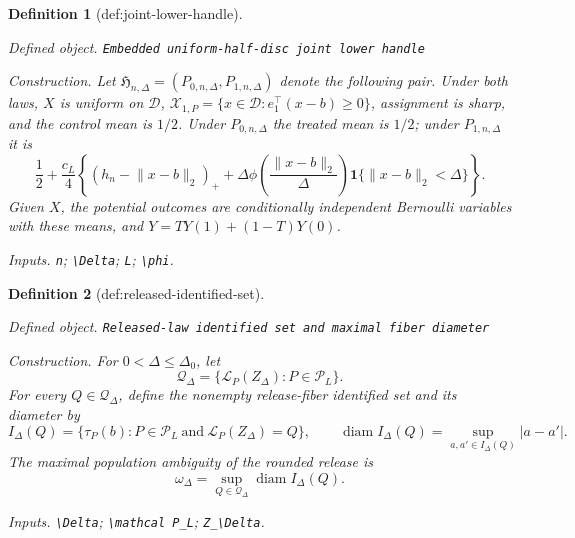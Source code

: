 \documentclass{article}
\newtheorem{definition}{Definition}
\begin{document}
\begin{definition}[def:joint-lower-handle]\label{def:joint-lower-handle}
\par\smallskip\noindent\emph{Defined object.} \texttt{Embedded uniform-\allowbreak{}half-\allowbreak{}disc joint lower handle}
\par\smallskip\noindent\emph{Construction.} Let \(\mathfrak H_{n,\Delta}=(P_{0,n,\Delta},P_{1,n,\Delta})\) denote the following pair.  Under both laws, \(X\) is uniform on \(\mathcal D\), \(\mathcal X_{1,P}=\{x\in\mathcal D:e_1^{\top}(x-b)\geq0\}\), assignment is sharp, and the control mean is \(1/2\).  Under \(P_{0,n,\Delta}\) the treated mean is \(1/2\); under \(P_{1,n,\Delta}\) it is
\[
 \frac12+\frac{c_L}{4}\left\{(h_n-\lVert x-b\rVert_2)_+
 +\Delta\phi\!\left(\frac{\lVert x-b\rVert_2}{\Delta}\right)
 \mathbf1\{\lVert x-b\rVert_2<\Delta\}\right\}.
\]
Given \(X\), the potential outcomes are conditionally independent Bernoulli variables with these means, and \(Y=TY(1)+(1-T)Y(0)\).
\par\smallskip\noindent\emph{Inputs.} \texttt{n}; \texttt{\textbackslash{}\allowbreak{}Delta}; \texttt{L}; \texttt{\textbackslash{}\allowbreak{}phi}.
\end{definition}

\begin{definition}[def:released-identified-set]\label{def:released-identified-set}
\par\smallskip\noindent\emph{Defined object.} \texttt{Released-\allowbreak{}law identified set and maximal fiber diameter}
\par\smallskip\noindent\emph{Construction.} For \(0<\Delta\leq\Delta_0\), let
\[
 \mathcal Q_\Delta=\{\mathcal L_P(Z_\Delta):P\in\mathcal P_L\}.
\]
For every \(Q\in\mathcal Q_\Delta\), define the nonempty release-fiber identified set and its diameter by
\[
 I_\Delta(Q)=\{\tau_P(b):P\in\mathcal P_L\ \text{and}\ \mathcal L_P(Z_\Delta)=Q\},
 \qquad
 \operatorname{diam} I_\Delta(Q)=\sup_{a,a'\in I_\Delta(Q)}|a-a'|.
\]
The maximal population ambiguity of the rounded release is
\[
 \omega_\Delta=\sup_{Q\in\mathcal Q_\Delta}\operatorname{diam} I_\Delta(Q).
\]
\par\smallskip\noindent\emph{Inputs.} \texttt{\textbackslash{}\allowbreak{}Delta}; \texttt{\textbackslash{}\allowbreak{}mathcal P\_\allowbreak{}L}; \texttt{Z\_\allowbreak{}\textbackslash{}\allowbreak{}Delta}.
\end{definition}
\end{document}

